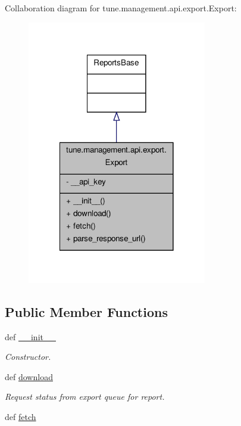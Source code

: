 Collaboration diagram for tune.\-management.\-api.\-export.\-Export\-:
\nopagebreak
\begin{figure}[H]
\begin{center}
\leavevmode
\includegraphics[width=222pt]{classtune_1_1management_1_1api_1_1export_1_1Export__coll__graph}
\end{center}
\end{figure}
\subsection*{Public Member Functions}
\begin{DoxyCompactItemize}
\item 
def \hyperlink{classtune_1_1management_1_1api_1_1export_1_1Export_a14c11f5e86025609ee4f1a02d190b038}{\-\_\-\-\_\-init\-\_\-\-\_\-}
\begin{DoxyCompactList}\small\item\em Constructor. \end{DoxyCompactList}\item 
def \hyperlink{classtune_1_1management_1_1api_1_1export_1_1Export_a7c8f4a974ae5d915feb57bc4c3502f93}{download}
\begin{DoxyCompactList}\small\item\em Request status from export queue for report. \end{DoxyCompactList}\item 
def \hyperlink{classtune_1_1management_1_1api_1_1export_1_1Export_af0819d2ba55d77f4f7f45ef5a91e1b96}{fetch}
\end{DoxyCompactItemize}
